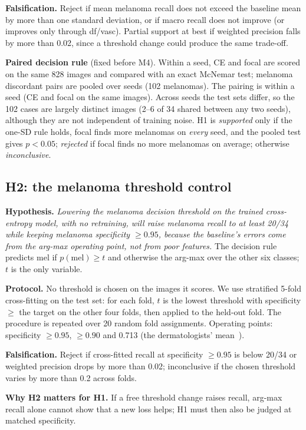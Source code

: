 \documentclass[conference]{IEEEtran}
\begin{document}
\textbf{Falsification.} Reject if mean melanoma recall does not exceed the baseline mean by more than one standard deviation, or if macro recall does not improve (or improves only through df/vasc). Partial support at best if weighted precision falls by more than 0.02, since a threshold change could produce the same trade-off.

\textbf{Paired decision rule} (fixed before M4). Within a seed, CE and focal are scored on the same 828 images and compared with an exact McNemar test; melanoma discordant pairs are pooled over seeds (102 melanomas). The pairing is within a seed (CE and focal on the same images). Across seeds the test sets differ, so the 102 cases are largely distinct images (2--6 of 34 shared between any two seeds), although they are not independent of training noise. H1 is \emph{supported} only if the one-SD rule holds, focal finds more melanomas on \emph{every} seed, and the pooled test gives $p<0.05$; \emph{rejected} if focal finds no more melanomas on average; otherwise \emph{inconclusive}.

\subsection{H2: the melanoma threshold control}
\textbf{Hypothesis.} \emph{Lowering the melanoma decision threshold on the trained cross-entropy model, with no retraining, will raise melanoma recall to at least 20/34 while keeping melanoma specificity $\geq0.95$, because the baseline's errors come from the arg-max operating point, not from poor features.} The decision rule predicts mel if $p(\text{mel})\geq t$ and otherwise the arg-max over the other six classes; $t$ is the only variable.

\textbf{Protocol.} No threshold is chosen on the images it scores. We use stratified 5-fold cross-fitting on the test set: for each fold, $t$ is the lowest threshold with specificity $\geq$ the target on the other four folds, then applied to the held-out fold. The procedure is repeated over 20 random fold assignments. Operating points: specificity $\geq0.95$, $\geq0.90$ and 0.713 (the dermatologists' mean~\cite{haenssle2018}).

\textbf{Falsification.} Reject if cross-fitted recall at specificity $\geq0.95$ is below 20/34 or weighted precision drops by more than 0.02; inconclusive if the chosen threshold varies by more than 0.2 across folds.

\textbf{Why H2 matters for H1.} If a free threshold change raises recall, arg-max recall alone cannot show that a new loss helps; H1 must then also be judged at matched specificity.
\end{document}
